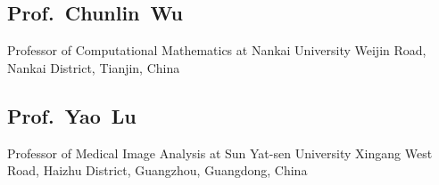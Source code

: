 \documentclass[11pt,a4paper, final]{moderncv}
\newcommand{\spacesubsection}{\vspace{0.2cm}}
\begin{document}
	\subsection{\textbf{Prof.~Chunlin~Wu}}
		\cvline{}
		{Professor of Computational Mathematics at Nankai University}
		{Weijin Road, Nankai District, Tianjin, China}
	\subsection{\textbf{Prof.~Yao~Lu}}
		\cvline{}
		{Professor of Medical Image Analysis at Sun Yat-sen University}
		{Xingang West Road, Haizhu District, Guangzhou, Guangdong, China}





% 
% 
\end{document}
